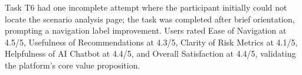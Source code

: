 Task T6 had one incomplete attempt where the participant initially could not locate the scenario analysis page; the task was completed after brief orientation, prompting a navigation label improvement. Users rated Ease of Navigation at 4.5/5, Usefulness of Recommendations at 4.3/5, Clarity of Risk Metrics at 4.1/5, Helpfulness of AI Chatbot at 4.4/5, and Overall Satisfaction at 4.4/5, validating the platform's core value proposition.
